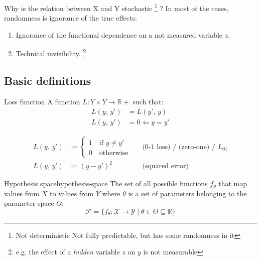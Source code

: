 \begin{question}{Why is the relation between X and Y stochastic%
		\footnote{Not deterministic \textrightarrow{} Not fully predictable, but has
			some randomness in it}%
		?}{}
	In most of the cases, randomness is ignorance of the true effects:
	\begin{enumerate}
		\item Ignorance of the functional dependence on a not measured variable
		      \(z\).
		\item Technical invisibility. \footnote{e.g. the effect of a
			      \emph{hidden} variable \(z\) on \(y\) is not measurable}
	\end{enumerate}
\end{question}

\subsection{Basic definitions}

\begin{definition}{Loss function}{}
	A function
	\(L: Y \times Y \longrightarrow \mathds{R}+\) such that:
	\begin{align*}
		L(y,\, y') & = L(y',\, y) \tag{symmetry} \\
		L(y,\, y') & = 0  \Longleftarrow y = y'
	\end{align*}

	\tcblower
	\begin{align*}
		L(y,\, y') & \coloneqq \begin{cases}1 \quad \text{if } y \neq y' \\ 0 \quad \text{otherwise} \end{cases} &  & \text{(0-1 loss) / (zero-one) / } L_{01} \\
		L(y,\, y') & \coloneqq (y - y')^2                                                                        &  & \text{(squared error)}
	\end{align*}
\end{definition}

\begin{definition}{Hypothesis space}{hypothesis-space}
	The set of all possible functions \(f_\theta\) that
	map values from \(X\) to values from \(Y\)
	where \(\theta\) is a set of
	parameters belonging to the parameter space \(\Theta\):
	\begin{equation*}
		\mathcal{F} = \bigl\{f_\theta: \mathcal{X} \rightarrow \mathcal{Y} \mid \theta \in \varTheta \subseteq \mathds{R} \bigr\}
	\end{equation*}
\end{definition}



